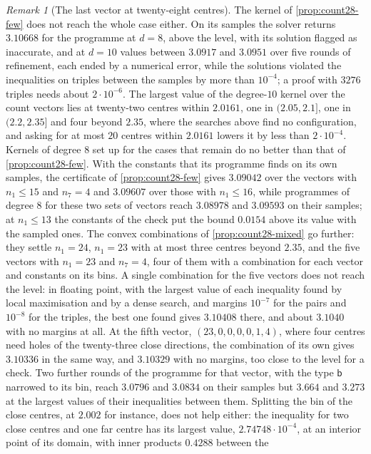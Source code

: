 \documentclass[11pt,reqno]{amsart}
\renewcommand{\_}{\origunderscore\allowbreak}
\numberwithin{equation}{section}
\theoremstyle{plain}
\theoremstyle{definition}
\theoremstyle{remark}
\newtheorem{remark}[thm]{Remark}
\begin{document}
\begin{remark}[The last vector at twenty-eight centres]
The kernel of \cref{prop:count28-few} does not reach the whole case either.
On its samples the solver returns $3.10668$ for the programme at $d=8$, above
the level, with its solution flagged as inaccurate, and at $d=10$ values
between $3.0917$ and $3.0951$ over five rounds of refinement, each ended by a
numerical error, while the solutions violated the inequalities on triples
between the samples by more than $10^{-4}$; a proof with $3276$ triples
needs about $2\cdot10^{-6}$. The largest value of the degree-$10$ kernel over
the count vectors lies at twenty-two centres within $2.0161$, one in
$(2.05,2.1]$, one in $(2.2,2.35]$ and four beyond $2.35$, where the searches
above find no configuration, and asking for at most $20$ centres within
$2.0161$ lowers it by less than $2\cdot10^{-4}$. Kernels of degree $8$ set
up for the cases that remain do no better than that of
\cref{prop:count28-few}. With the constants that its programme finds on its
own samples, the certificate of \cref{prop:count28-few} gives $3.09042$ over
the vectors with $n_1\le15$ and $n_7=4$ and $3.09607$ over those with
$n_1\le16$, while programmes of degree $8$ for these two sets of vectors
reach $3.08978$ and $3.09593$ on their samples; at $n_1\le13$ the constants
of the check put the bound $0.0154$ above its value with the sampled ones.
The convex combinations of \cref{prop:count28-mixed} go further: they
settle $n_1=24$, $n_1=23$ with at most three centres beyond $2.35$, and the
five vectors with $n_1=23$ and $n_7=4$, four of them with a combination for
each vector and constants on its bins. A single combination
for the five vectors does not reach the level: in floating point, with the
largest value of each inequality found by local maximisation and by a dense
search, and margins $10^{-7}$ for the pairs and $10^{-8}$ for the triples,
the best one found gives $3.10408$ there, and about $3.1040$ with no margins
at all. At the fifth vector, $(23,0,0,0,0,1,4)$, where four centres need
holes of the twenty-three close directions, the combination of its own
gives $3.10336$ in the same way, and $3.10329$ with no margins, too close to
the level for a check. Two further rounds of the programme for that vector,
with the type $\mathsf b$ narrowed to its bin, reach $3.0796$ and $3.0834$
on their samples but $3.664$ and $3.273$ at the largest values of their
inequalities between them. Splitting the bin of the close centres, at
$2.002$ for instance, does not help either: the inequality for two close
centres and one far centre has its largest value, $2.74748\cdot10^{-4}$, at
an interior point of its domain, with inner products $0.4288$ between the

\end{remark}
\end{document}

